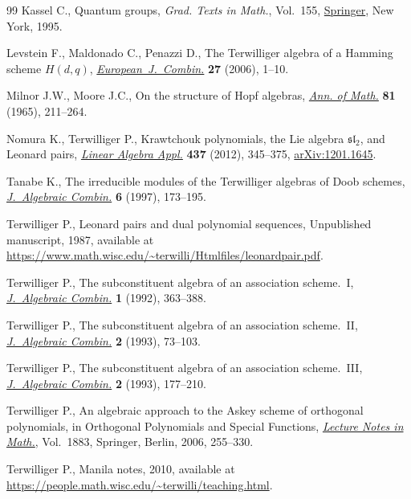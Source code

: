 \documentclass[10pt,a4paper]{amsart}
\numberwithin{equation}{section}
\begin{document}
\begin{thebibliography}{99}
Kassel C., Quantum groups, \textit{Grad. Texts in Math.}, Vol.~155, \href{https://doi.org/10.1007/978-1-4612-0783-2}{Springer},
 New York, 1995.

Levstein F., Maldonado C., Penazzi D., The {T}erwilliger algebra of a {H}amming
 scheme {$H(d,q)$}, \href{https://doi.org/10.1016/j.ejc.2004.08.005}{\textit{European~J.~Combin.}} \textbf{27} (2006), 1--10.

Milnor J.W., Moore J.C., On the structure of {H}opf algebras, \href{https://doi.org/10.2307/1970615}{\textit{Ann. of
 Math.}} \textbf{81} (1965), 211--264.

Nomura K., Terwilliger P., Krawtchouk polynomials, the {L}ie algebra
 {$\mathfrak{sl}_2$}, and {L}eonard pairs, \href{https://doi.org/10.1016/j.laa.2012.02.006}{\textit{Linear Algebra Appl.}}
 \textbf{437} (2012), 345--375, \href{https://arxiv.org/abs/1201.1645}{arXiv:1201.1645}.

Tanabe K., The irreducible modules of the {T}erwilliger algebras of {D}oob
 schemes, \href{https://doi.org/10.1023/A:1008647205853}{\textit{J.~Algebraic Combin.}} \textbf{6} (1997), 173--195.

Terwilliger P., Leonard pairs and dual polynomial sequences, {U}npublished
 manuscript, 1987, available at
 \url{https://www.math.wisc.edu/~terwilli/Htmlfiles/leonardpair.pdf}.

Terwilliger P., The subconstituent algebra of an association scheme.~{I},
 \href{https://doi.org/10.1023/A:1022494701663}{\textit{J.~Algebraic Combin.}} \textbf{1} (1992), 363--388.

Terwilliger P., The subconstituent algebra of an association scheme.~{II},
 \href{https://doi.org/10.1023/A:1022480715311}{\textit{J.~Algebraic Combin.}} \textbf{2} (1993), 73--103.

Terwilliger P., The subconstituent algebra of an association scheme.~{III},
 \href{https://doi.org/10.1023/A:1022415825656}{\textit{J.~Algebraic Combin.}} \textbf{2} (1993), 177--210.

Terwilliger P., An algebraic approach to the {A}skey scheme of orthogonal
 polynomials, in Orthogonal Polynomials and Special Functions, \href{https://doi.org/10.1007/978-3-540-36716-1_6}{\textit{Lecture
 Notes in Math.}}, Vol.~1883, Springer, Berlin, 2006, 255--330.

 Terwilliger P., Manila notes, 2010, available at \url{https://people.math.wisc.edu/~terwilli/teaching.html}.


\end{thebibliography}
\end{document}
